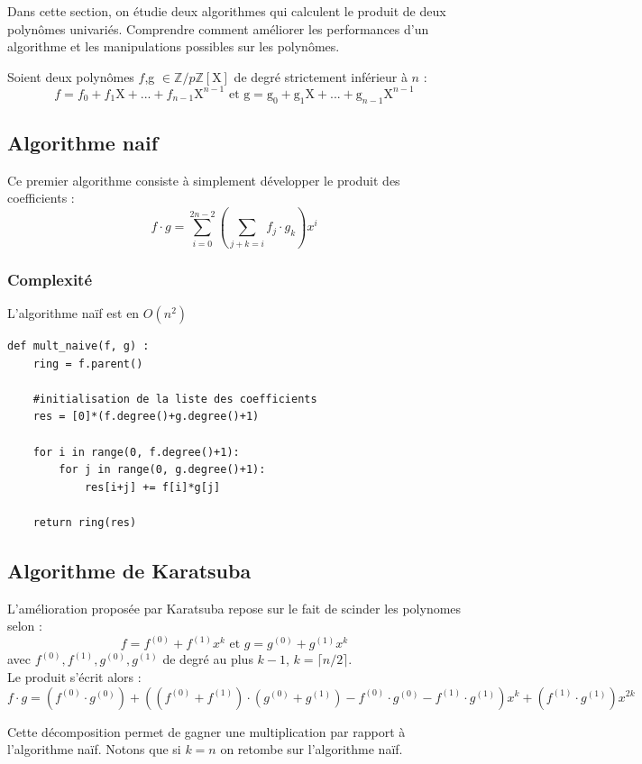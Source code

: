 \documentclass[a4paper]{article}
\begin{document}
Dans cette section, on étudie deux algorithmes qui calculent le produit de deux polynômes univariés.
Comprendre comment améliorer les performances d'un algorithme et les manipulations possibles sur les polynômes.


Soient deux polynômes $f$,g $\in \mathbb{Z}/p\mathbb{Z}[\mathrm{X}]$ de degré strictement inférieur à $n$ :
\[
f=f_0+f_1\mathrm{X}+...+f_{n-1}\mathrm{X}^{n-1}\text{ et g}=\mathrm{g}_0+\mathrm{g}_1\mathrm{X}+...+\mathrm{g}_{n-1}\mathrm{X}^{n-1}
\]

\subsection{Algorithme naif}

Ce premier algorithme consiste à simplement développer le produit des coefficients :
\[
f\cdot g=\sum_{i=0}^{2n-2} (\sum_{j+k=i}f_j\cdot g_k) x^i
\]

\subsubsection*{Complexité}
L'algorithme naïf est en $O(n^2)$

\begin{lstlisting}[title={multiplication naive}]
    def mult_naive(f, g) :
    ring = f.parent()

    #initialisation de la liste des coefficients
    res = [0]*(f.degree()+g.degree()+1) 
    
    for i in range(0, f.degree()+1):
        for j in range(0, g.degree()+1):
            res[i+j] += f[i]*g[j]

    return ring(res) 
\end{lstlisting}


\subsection{Algorithme de Karatsuba}

L'amélioration proposée par Karatsuba repose sur le fait de scinder les polynomes selon :
\[
f=f^{(0)}+f^{(1)}x^k\text{ et }g = g^{(0)}+g^{(1)}x^k
\]
avec $f^{(0)}, f^{(1)}, g^{(0)}, g^{(1)}$ de degré au plus $k-1$, $k=\lceil n/2 \rceil$. \\
Le produit s'écrit alors :
\[
  f\cdot g = (f^{(0)}\cdot g^{(0)})
  +\left((f^{(0)}+f^{(1)})\cdot (g^{(0)} + g^{(1)}) - f^{(0)}\cdot g^{(0)} - f^{(1)}\cdot g^{(1)}\right)x^k+
  (f^{(1)}\cdot g^{(1)})x^{2k} 
\]

Cette décomposition permet de gagner une multiplication par rapport à l'algorithme naïf. Notons que si $k=n$ on retombe sur l'algorithme naïf.
\end{document}

